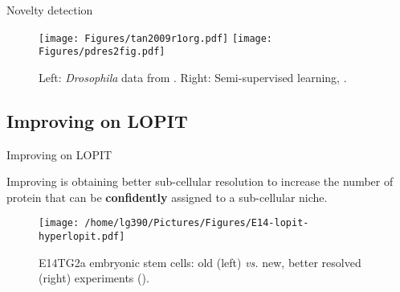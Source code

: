 \begin{frame}{Novelty detection}
  \begin{figure}
    \texttt{[image: Figures/tan2009r1org.pdf]}
    \texttt{[image: Figures/pdres2fig.pdf]}
    \caption{Left: \textit{Drosophila} data from
      \cite{Tan2009}. Right: Semi-supervised learning,
      \cite{Breckels:2013}.}
  \end{figure} 
\end{frame}


\subsection{Improving on LOPIT}

\begin{frame}{Improving on LOPIT}

  Improving is obtaining better sub-cellular resolution to increase
  the number of protein that can be \textbf{confidently} assigned to a
  sub-cellular niche.

  \begin{figure}[h]
    \centering
    \texttt{[image: /home/lg390/Pictures/Figures/E14-lopit-hyperlopit.pdf]}    
    \caption{E14TG2a embryonic stem cells: old (left) \textit{vs.} new, better
      resolved (right) experiments (\cite{Christoforou:2016}).}
  \end{figure}
  
\end{frame}  


